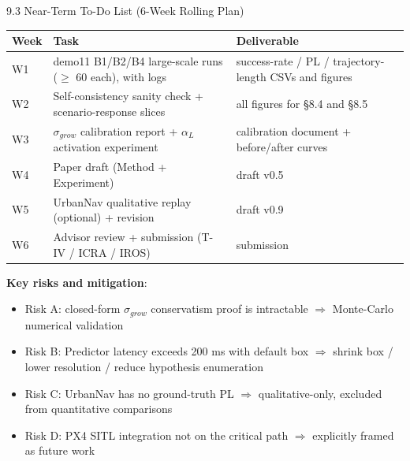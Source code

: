 \documentclass[10pt,aspectratio=169,xcolor=dvipsnames]{beamer}
\newcommand{\1}{\mathbb{1}}
\begin{document}
\begin{frame}{9.3 Near-Term To-Do List (6-Week Rolling Plan)}
  \small
  \begin{table}
    \scriptsize
    \begin{tabular}{p{} p{} p{}}
      \toprule
      \textbf{Week} & \textbf{Task} & \textbf{Deliverable}\\
      \midrule
      W1 & demo11 B1/B2/B4 large-scale runs ($\ge$ 60 each), with logs & success-rate / PL / trajectory-length CSVs and figures\\
      W2 & Self-consistency sanity check + scenario-response slices & all figures for \S8.4 and \S8.5\\
      W3 & $\sigma_{grow}$ calibration report + $\alpha_L$ activation experiment & calibration document + before/after curves\\
      W4 & Paper draft (Method + Experiment) & draft v0.5\\
      W5 & UrbanNav qualitative replay (optional) + revision & draft v0.9\\
      W6 & Advisor review + submission (T-IV / ICRA / IROS) & submission\\
      \bottomrule
    \end{tabular}
  \end{table}

  \medskip
  \textbf{Key risks and mitigation}:
  \begin{itemize}\scriptsize
    \item Risk A: closed-form $\sigma_{grow}$ conservatism proof is intractable $\Rightarrow$ Monte-Carlo numerical validation
    \item Risk B: Predictor latency exceeds 200 ms with default box $\Rightarrow$ shrink box / lower resolution / reduce hypothesis enumeration
    \item Risk C: UrbanNav has no ground-truth PL $\Rightarrow$ qualitative-only, excluded from quantitative comparisons
    \item Risk D: PX4 SITL integration not on the critical path $\Rightarrow$ explicitly framed as future work
  \end{itemize}
\end{frame}
\end{document}
